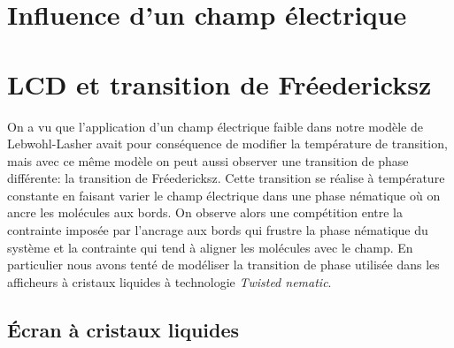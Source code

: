 \documentclass[11pt,a4paper]{article}
\numberwithin{equation}{section}
\begin{document}
\newpage
\section{Influence d'un champ électrique}


\section{LCD et transition de Fréedericksz}
On a vu que l'application d'un champ électrique faible dans notre modèle de Lebwohl-Lasher avait pour conséquence de modifier la température de transition, mais avec ce même modèle on peut aussi observer une transition de phase différente: la transition de Fréedericksz. Cette transition se réalise à température constante en faisant varier le champ électrique dans une phase nématique où on ancre les molécules aux bords. On observe alors une compétition entre la contrainte imposée par l'ancrage aux bords qui frustre la phase nématique du système et la contrainte qui tend à aligner les molécules avec le champ. 
 En particulier nous avons tenté de modéliser la transition de phase utilisée dans les afficheurs à cristaux liquides à technologie \textit{Twisted nematic}.
\subsection{Écran à cristaux liquides}
\end{document}
